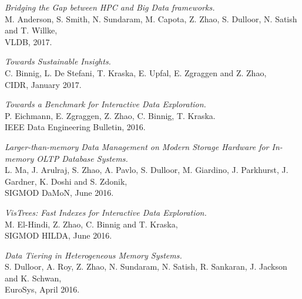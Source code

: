 \documentclass[letterpaper]{article}
\renewenvironment{itemize}{
  \begin{list}{}{
    \setlength{\leftmargin}{1.5em}
  }
}{
  \end{list}
}
\begin{document}
\begin{itemize}
\item \textit{Bridging the Gap between HPC and Big Data frameworks.} \\
  M. Anderson, S. Smith, N. Sundaram, M. Capota, Z. Zhao, S. Dulloor, N. Satish and T. Willke, \\
  VLDB, 2017.

\item \textit{Towards Sustainable Insights.} \\
  C. Binnig, L. De Stefani, T. Kraska, E. Upfal, E. Zgraggen and Z. Zhao, \\
  CIDR, January 2017.

\item \textit{Towards a Benchmark for Interactive Data Exploration.} \\
  P. Eichmann, E. Zgraggen, Z. Zhao, C. Binnig, T. Kraska. \\
   IEEE Data Engineering Bulletin, 2016.

\item \textit{Larger-than-memory Data Management on Modern Storage Hardware for In-memory OLTP Database Systems.} \\
  L. Ma, J. Arulraj, S. Zhao, A. Pavlo, S. Dulloor, M. Giardino, J. Parkhurst, J. Gardner, K. Doshi and S. Zdonik, \\
  SIGMOD DaMoN, June 2016.

\item \textit{VisTrees: Fast Indexes for Interactive Data Exploration.} \\
  M. El-Hindi, Z. Zhao, C. Binnig and T. Kraska, \\
  SIGMOD HILDA, June 2016.

\item \textit{Data Tiering in Heterogeneous Memory Systems.} \\
  S. Dulloor, A. Roy, Z. Zhao, N. Sundaram, N. Satish, R. Sankaran, J. Jackson and K. Schwan, \\
  EuroSys, April 2016.

\end{itemize}
\end{document}
